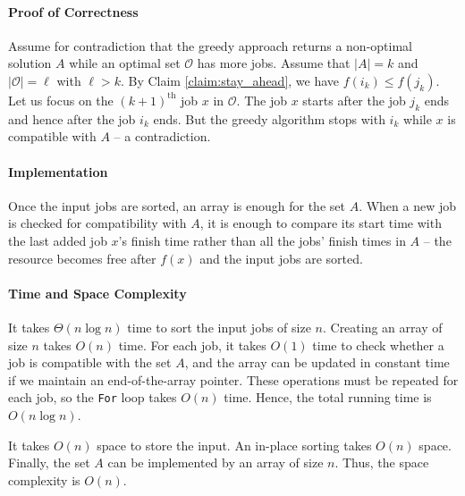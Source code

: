 \documentclass[11pt]{537homework}
\newcommand{\ord}[2][th]{\ensuremath{{#2}^{\mathrm{#1}}}}
\newcommand{\Ocal}{\ensuremath{\mathcal{O}}}
\begin{document}
\paragraph{Proof of Correctness}
Assume for contradiction that the greedy approach returns a
non-optimal solution $A$ while an optimal set $\Ocal$ has more
jobs. Assume that $|A|=k$ and $|\Ocal|=\ell$ with $\ell > k$.
By Claim \ref{claim:stay_ahead}, we have $f(i_k)\leq f(j_k)$.
Let us focus on the $\ord{(k+1)}$ job $x$ in $\Ocal$. The job $x$ starts
after the job $j_k$ ends and hence after the job $i_k$ ends.
But the greedy algorithm stops with $i_k$ while $x$ is compatible with
$A$ -- a contradiction.

\paragraph{Implementation}
Once the input jobs are sorted, an array is enough for the set $A$.
When a new job is checked for compatibility with $A$, it is
enough to compare its start time with the last added job $x$'s finish time rather
than all the jobs' finish  times in
$A$ -- the resource becomes free after $f(x)$ and the input jobs are
sorted.

\paragraph{Time and Space Complexity}
It takes $\Theta(n \log n)$ time to sort the input jobs of size $n$.
Creating an array of size $n$ takes $O(n)$ time.
For each job, it takes $O(1)$ time to check whether a job is
compatible with the set $A$, and the array can be updated in
constant time if we maintain an end-of-the-array pointer.
These operations must be repeated for each job, so the \texttt{For}
loop takes $O(n)$ time. Hence, the total running time is
$O(n\log n)$.

It takes $O(n)$ space to store the input. An in-place
sorting takes $O(n)$ space. Finally, the set $A$ can be implemented
by an array of size $n$. Thus, the space complexity is $O(n)$.
\end{document}
